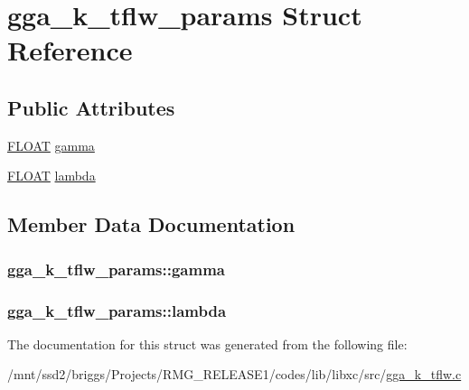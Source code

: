 \hypertarget{structgga__k__tflw__params}{\section{gga\-\_\-k\-\_\-tflw\-\_\-params Struct Reference}
\label{structgga__k__tflw__params}
}
\subsection*{Public Attributes}
\begin{DoxyCompactItemize}
\item 
\hyperlink{src_2xc__config_8h_ae8690abbffa85934d64d545920e2b108}{F\-L\-O\-A\-T} \hyperlink{structgga__k__tflw__params_a1e04be678754f6fece1ed619cb60daaf}{gamma}
\item 
\hyperlink{src_2xc__config_8h_ae8690abbffa85934d64d545920e2b108}{F\-L\-O\-A\-T} \hyperlink{structgga__k__tflw__params_ae0690f9d9749a5bc5a09762cb55b2c38}{lambda}
\end{DoxyCompactItemize}


\subsection{Member Data Documentation}
\hypertarget{structgga__k__tflw__params_a1e04be678754f6fece1ed619cb60daaf}{
\subsubsection[{gamma}]{ gga\-\_\-k\-\_\-tflw\-\_\-params\-::gamma}}\label{structgga__k__tflw__params_a1e04be678754f6fece1ed619cb60daaf}
\hypertarget{structgga__k__tflw__params_ae0690f9d9749a5bc5a09762cb55b2c38}{
\subsubsection[{lambda}]{ gga\-\_\-k\-\_\-tflw\-\_\-params\-::lambda}}\label{structgga__k__tflw__params_ae0690f9d9749a5bc5a09762cb55b2c38}


The documentation for this struct was generated from the following file\-:\begin{DoxyCompactItemize}
\item 
/mnt/ssd2/briggs/\-Projects/\-R\-M\-G\-\_\-\-R\-E\-L\-E\-A\-S\-E1/codes/lib/libxc/src/\hyperlink{gga__k__tflw_8c}{gga\-\_\-k\-\_\-tflw.\-c}\end{DoxyCompactItemize}
